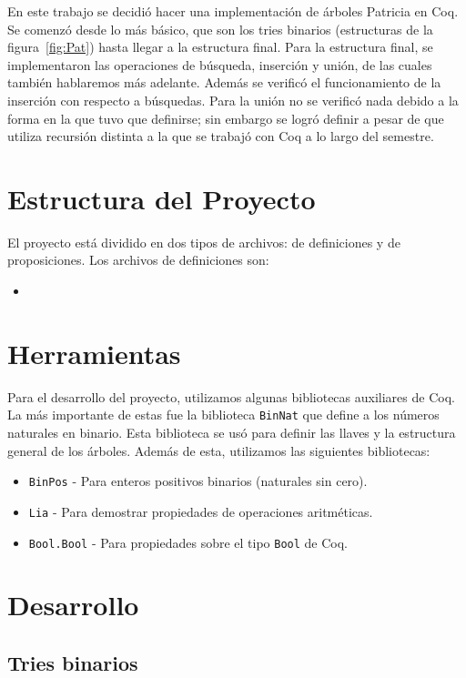 \documentclass[11pt,letterpaper]{article}
\begin{document}
En este trabajo se decidió hacer una implementación de árboles Patricia en Coq. Se comenzó desde lo más básico, que son los tries binarios (estructuras de la figura~\ref{fig:Pat}) hasta llegar a la estructura final. Para la estructura final, se implementaron las operaciones de búsqueda, inserción y unión, de las cuales también hablaremos más adelante. Además se verificó el funcionamiento de la inserción con respecto a búsquedas. Para la unión no se verificó nada debido a la forma en la que tuvo que definirse; sin embargo se logró definir a pesar de que utiliza recursión distinta a la que se trabajó con Coq a lo largo del semestre.

\section{Estructura del Proyecto}
\noindent El proyecto está dividido en dos tipos de archivos: de definiciones y de proposiciones. Los archivos de definiciones son:
\begin{itemize}
  \item 
\end{itemize}

\section{Herramientas}

\noindent Para el desarrollo del proyecto, utilizamos algunas bibliotecas auxiliares de Coq. La más importante de estas fue la biblioteca \texttt{BinNat}\cite{} que define a los números naturales en binario. Esta biblioteca se usó para definir las llaves y la estructura general de los árboles. Además de esta, utilizamos las siguientes bibliotecas:
\begin{itemize}
\item \texttt{BinPos} - Para enteros positivos binarios (naturales sin cero).
\item \texttt{Lia} - Para demostrar propiedades de operaciones aritméticas.
\item \texttt{Bool.Bool} - Para propiedades sobre el tipo \texttt{Bool} de Coq.
\end{itemize}

\section{Desarrollo}

\subsection{Tries binarios}
\end{document}
